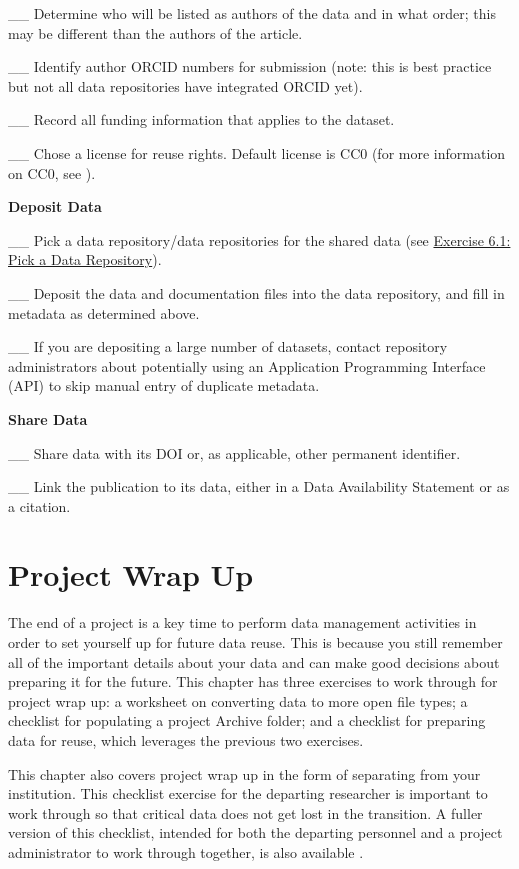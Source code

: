 \documentclass[
]{book}
\begin{document}
\_\_ Determine who will be listed as authors of the data and in what order; this may be different than the authors of the article.

\_\_ Identify author ORCID numbers for submission (note: this is best practice but not all data repositories have integrated ORCID yet).

\_\_ Record all funding information that applies to the dataset.

\_\_ Chose a license for reuse rights. Default license is CC0 (for more information on CC0, see \citep{creative_commons_wiki_cc0_2014}).

\textbf{Deposit Data}

\_\_ Pick a data repository/data repositories for the shared data (see \protect\hyperlink{data-repository}{Exercise 6.1: Pick a Data Repository}).

\_\_ Deposit the data and documentation files into the data repository, and fill in metadata as determined above.

\_\_ If you are depositing a large number of datasets, contact repository administrators about potentially using an Application Programming Interface (API) to skip manual entry of duplicate metadata.

\textbf{Share Data}

\_\_ Share data with its DOI or, as applicable, other permanent identifier.

\_\_ Link the publication to its data, either in a Data Availability Statement or as a citation.

\hypertarget{project-wrap-up}{%
\chapter{Project Wrap Up}\label{project-wrap-up}}

The end of a project is a key time to perform data management activities in order to set yourself up for future data reuse. This is because you still remember all of the important details about your data and can make good decisions about preparing it for the future. This chapter has three exercises to work through for project wrap up: a worksheet on converting data to more open file types; a checklist for populating a project Archive folder; and a checklist for preparing data for reuse, which leverages the previous two exercises.

This chapter also covers project wrap up in the form of separating from your institution. This checklist exercise for the departing researcher is important to work through so that critical data does not get lost in the transition. A fuller version of this checklist, intended for both the departing personnel and a project administrator to work through together, is also available \citep{goben_data_2023}.
\end{document}
